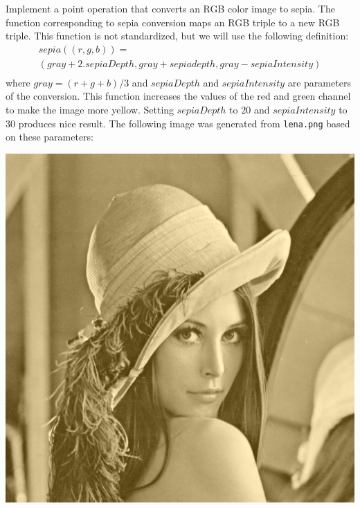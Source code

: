 \documentclass{book}
\begin{document}
\begin{exercise}
Implement a point operation  that converts an RGB color image to sepia. The function corresponding to sepia conversion maps an RGB triple to a new RGB triple. This function is not standardized, but we will use the following definition:
$$\begin{array}{c}
sepia((r, g, b)) = \\
({gray}+ 2.{sepiaDepth}, {gray} + {sepiadepth}, {gray} - {sepiaIntensity})\\
\end{array}$$
where $gray = (r + g + b) / 3$ and ${sepiaDepth}$ and ${sepiaIntensity}$ are parameters of the conversion. This function increases the values of the red and green channel to make the image more yellow.  Setting ${sepiaDepth}$ to $20$  and ${sepiaIntensity}$ to $30$ produces nice result. The following image was generated from \texttt{lena.png} based on these parameters:
\begin{center}
\includegraphics[scale=0.20]{lena-sepia.png}
\end{center}
\end{exercise}
\end{document}
